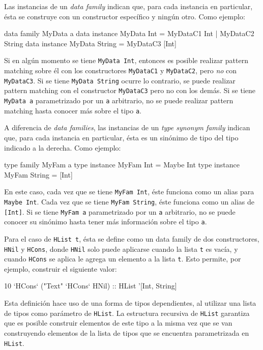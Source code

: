 Las instancias de un \textit{data family} indican que, para cada instancia en particular, ésta se construye con un constructor específico y ningún otro. Como ejemplo:

\begin{code}
data family MyData a
data instance MyData Int = 
  MyDataC1 Int | MyDataC2 String
data instance MyData String = MyDataC3 [Int]
\end{code}

Si en algún momento se tiene \texttt{MyData Int}, entonces es posible realizar pattern matching sobre él con los constructores \texttt{MyDataC1} y \texttt{MyDataC2}, pero \textit{no} con \texttt{MyDataC3}. Si se tiene \texttt{MyData String} ocurre lo contrario, se puede realizar pattern matching con el constructor \texttt{MyDataC3} pero no con los demás. Si se tiene \texttt{MyData a} parametrizado por un \texttt{a} arbitrario, no se puede realizar pattern matching hasta conocer más sobre el tipo \texttt{a}.

A diferencia de \textit{data families}, las instancias de un \textit{type synonym family} indican que, para cada instancia en particular, ésta es un sinónimo de tipo del tipo indicado a la derecha. Como ejemplo:

\begin{code}
type family MyFam a
type instance MyFam Int = Maybe Int
type instance MyFam String = [Int]
\end{code}

En este caso, cada vez que se tiene \texttt{MyFam Int}, éste funciona como un alias para \texttt{Maybe Int}. Cada vez que se tiene \texttt{MyFam String}, éste funciona como un alias de \texttt{[Int]}. Si se tiene \texttt{MyFam a} parametrizado por un \texttt{a} arbitrario, no se puede conocer su sinónimo hasta tener más información sobre el tipo \texttt{a}.

Para el caso de \texttt{HList t}, ésta se define como un data family de dos constructores, \texttt{HNil} y \texttt{HCons}, donde \texttt{HNil} solo puede aplicarse cuando la lista \texttt{t} es vacía, y cuando \texttt{HCons} se aplica le agrega un elemento a la lista \texttt{t}. Esto permite, por ejemplo, construir el siguiente valor:

\begin{code}
10 `HCons` ("Text" `HCons` HNil) :: HList '[Int, String]
\end{code}

Esta definición hace uso de una forma de tipos dependientes, al utilizar una lista de tipos como parámetro de \texttt{HList}. La estructura recursiva de \texttt{HList} garantiza que es posible construir elementos de este tipo a la misma vez que se van construyendo elementos de la lista de tipos que se encuentra parametrizada en \texttt{HList}.

